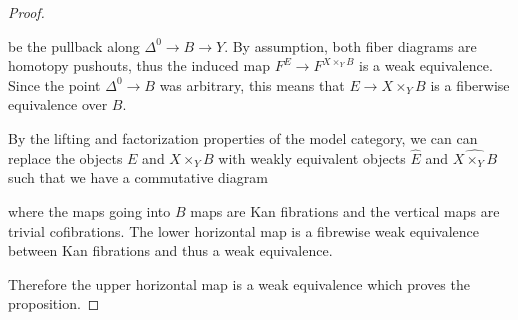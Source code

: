 \begin{prop}
\begin{proof}
\begin{center}
        \end{center}
        be the pullback along $\Delta^0\to B\to Y$.
        By assumption, both fiber diagrams are homotopy pushouts, thus the induced map $F^E\to F^{X\times_Y B}$ is a weak equivalence.
        Since the point $\Delta^0\to B$ was arbitrary, this means that $E\to X\times_Y B$ is a fiberwise equivalence over $B$.

        By the lifting and factorization properties of the model category, we can can replace the objects $E$ and $X\times_Y B$ with weakly equivalent objects $\widehat{E}$ and $\widehat{X\times_Y B}$ such that we have a commutative diagram
        \begin{center}
        \end{center} 
        where the maps going into $B$ maps are Kan fibrations and the vertical maps are trivial cofibrations.
        The lower horizontal map is a fibrewise weak equivalence between Kan fibrations and thus a weak equivalence.

        Therefore the upper horizontal map is a weak equivalence which proves the proposition.
    \end{proof}
\end{prop}
